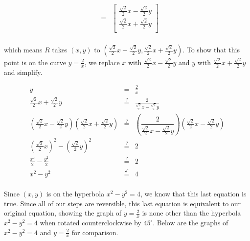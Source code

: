 \documentclass{ximera}
\begin{document}
\begin{example}
\begin{enumerate}
\[\begin{array}{rcl}
& = & \left[ \begin{array}{r} \frac{\sqrt{2}}{2} x - \frac{\sqrt{2}}{2} y \\   \frac{\sqrt{2}}{2} x + \frac{\sqrt{2}}{2} y \\ \end{array} \right] \\

\end{array}\]

which means $R$ takes $(x,y)$ to $\left(\frac{\sqrt{2}}{2} x - \frac{\sqrt{2}}{2} y, \frac{\sqrt{2}}{2} x + \frac{\sqrt{2}}{2} y\right)$.  To show that this point is on the curve $y = \frac{2}{x}$, we replace $x$ with $\frac{\sqrt{2}}{2} x - \frac{\sqrt{2}}{2} y$ and $y$ with $\frac{\sqrt{2}}{2} x + \frac{\sqrt{2}}{2} y$ and simplify.

\[ \begin{array}{rcl}

y & = & \frac{2}{x} \\

\frac{\sqrt{2}}{2} x + \frac{\sqrt{2}}{2} y & \stackrel{?}{=} & \frac{2}{\frac{\sqrt{2}}{2} x - \frac{\sqrt{2}}{2} y} \\[10pt]

\left(\frac{\sqrt{2}}{2} x - \frac{\sqrt{2}}{2} y \right) \left(\frac{\sqrt{2}}{2} x + \frac{\sqrt{2}}{2} y \right)& \stackrel{?}{=} & \left(\dfrac{2}{\frac{\sqrt{2}}{2} x - \frac{\sqrt{2}}{2} y}\right) \left(  \frac{\sqrt{2}}{2} x - \frac{\sqrt{2}}{2} y  \right)\\

\left(\frac{\sqrt{2}}{2} x \right)^2 - \left( \frac{\sqrt{2}}{2} y\right)^2 & \stackrel{?}{=} & 2 \\

\frac{x^2}{2} - \frac{y^2}{2} & \stackrel{?}{=} & 2 \\

x^2 - y^2 & \stackrel{\checkmark }{=}& 4  \\

\end{array} \]

Since $(x,y)$ is on the hyperbola $x^2 - y^2 = 4$, we know that this last equation is true.  Since all of our steps are reversible, this last equation is equivalent to our original equation, showing the graph of $y=\frac{2}{x}$ is none other than the hyperbola $x^2-y^2=4$ when rotated counterclockwise by $45^{\circ}$.  Below are the graphs of $x^2-y^2=4$  and $y = \frac{2}{x}$  for comparison.


\end{enumerate}
\end{example}
\end{document}
